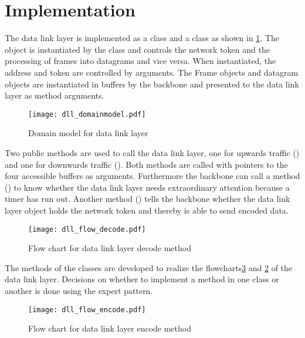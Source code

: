 \section{Implementation}
The data link layer is implemented as a  class and a
 class as shown in \ref{fig:class_diag_for_datalink}. The
 object is instantiated by the  class and
controls the network token and the processing of frames into datagrams and vice
versa. When instantiated, the address and token are controlled by arguments. The
Frame objects and datagram objects are instantiated in buffers by the backbone
and presented to the data link layer as method arguments.

\begin{figure}[htb]
	\begin{center}
	\texttt{[image: dll\_domainmodel.pdf]}
	\caption{Domain model for data link layer}
	\label{fig:class_diag_for_datalink}	
	\end{center}
\end{figure}

Two public methods are used to call the data link layer, one for upwards traffic
() and one for downwards traffic (). Both methods are called with
pointers to the four accessible buffers as arguments. Furthermore the backbone
can call a method () to know whether the data link layer needs
extraordinary attention because a timer has run out. Another method
() tells the backbone whether the data link layer object holds the
network token and thereby is able to send encoded data.

\begin{figure}[htb]
	\begin{center}
	\texttt{[image: dll\_flow\_decode.pdf]}
	\caption{Flow chart for data link layer decode method}
	\label{fig:dll_flow_decode}	
	\end{center}
\end{figure}

The methods of the classes are developed to realize the
flowcharts\ref{fig:dll_flow_encode} and
\ref{fig:dll_flow_decode} of the data link layer. Decisions on whether to implement a method in one class or another is done using the expert pattern.

\begin{figure}[htb]
	\begin{center}
	\texttt{[image: dll\_flow\_encode.pdf]}
	\caption{Flow chart for data link layer encode method}
	\label{fig:dll_flow_encode}	
	\end{center}
\end{figure}
